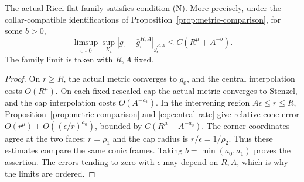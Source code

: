 \begin{lemma}\label{lem:model-comparison}
The actual Ricci-flat family satisfies condition \textup{(N)}. More
precisely, under the collar-compatible identifications of
Proposition~\ref{prop:metric-comparison}, for some $b>0$,
\begin{equation}\label{eq:model-comparison}
 \limsup_{\epsilon\downarrow0}\sup_{X_t}
 |g_\epsilon-\bar g_\epsilon^{R,A}|_{\bar g_\epsilon^{R,A}}
 \le C(R^\mu+A^{-b}).
\end{equation}
The family limit is taken with $R,A$ fixed.
\end{lemma}
\begin{proof}
On $r\ge R$, the actual metric converges to $g_0$, and the central
interpolation costs $O(R^\mu)$. On each fixed rescaled cap the actual
metric converges to Stenzel, and the cap interpolation costs
$O(A^{-a_1})$. In the intervening region $A\epsilon\le r\le R$,
Proposition~\ref{prop:metric-comparison} and
\eqref{eq:central-rate} give relative cone error
$O(r^\mu)+O((\epsilon/r)^{a_0})$, bounded by
$C(R^\mu+A^{-a_0})$. The corner coordinates agree at the two faces:
$r=\rho_1$ and the cap radius is $r/\epsilon=1/\rho_2$.
Thus these estimates compare the same conic frames. Taking
$b=\min(a_0,a_1)$ proves the assertion. The errors tending to zero
with $\epsilon$ may depend on $R,A$, which is why the limits are ordered.
\end{proof}


